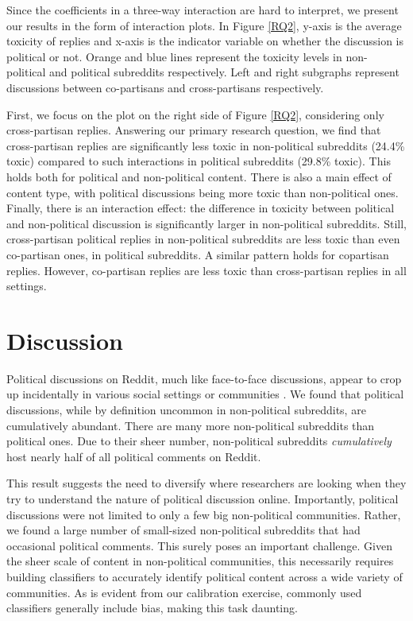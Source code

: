 \documentclass[letterpaper]{article} %
\begin{document}
Since the coefficients in a three-way interaction are hard to interpret, we present our results in the form of interaction plots. In Figure \ref{RQ2}, y-axis is the average toxicity of replies and x-axis is the indicator variable on whether the discussion is political or not. Orange and blue lines represent the toxicity levels in non-political and political subreddits respectively. Left and right subgraphs represent discussions between co-partisans and cross-partisans respectively. 

First, we focus on the plot on the right side of Figure  \ref{RQ2}, considering only cross-partisan replies. Answering our primary research question, we find that cross-partisan replies are significantly less toxic in non-political subreddits (24.4\% toxic) compared to such interactions in political subreddits (29.8\% toxic). 
This holds both for political and non-political content. There is also a main effect of content type, with political discussions being more toxic than non-political ones. 
Finally, there is an interaction effect: the difference in toxicity between political and non-political discussion is significantly larger in non-political subreddits. Still, cross-partisan political replies in non-political subreddits are less toxic than even co-partisan ones, in political subreddits.
A similar pattern holds for copartisan replies. However, co-partisan replies are less toxic than cross-partisan replies in all settings. 

\section{Discussion}



Political discussions on Reddit, much like face-to-face discussions, appear to crop up incidentally in various social settings or communities \cite{conover2018taking}. We found that political discussions, while by definition uncommon in non-political subreddits, are cumulatively abundant. There are many more non-political subreddits than political ones. 
Due to their sheer number, non-political subreddits \textit{cumulatively} host nearly half of all political comments on Reddit.

This result suggests the need to diversify where researchers are looking when they try to understand the nature of political discussion online.  
Importantly, political discussions were not limited to only a few big non-political communities. Rather, we found a large number of small-sized non-political subreddits that had occasional political comments. 
This surely poses an important challenge. Given the sheer scale of content in non-political communities, this necessarily requires building classifiers to accurately identify political content across a wide variety of communities. As is evident from our calibration exercise, commonly used classifiers generally include bias, making this task daunting.
\end{document}
